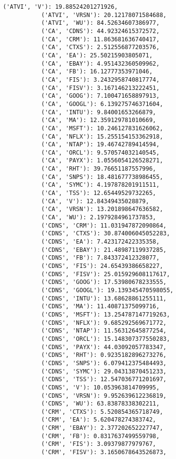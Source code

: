 \documentclass[11pt]{article}
\begin{document}
\begin{Verbatim}[commandchars=\\\{\}]
           ('ATVI', 'V'): 19.88524201271926,
           ('ATVI', 'VRSN'): 20.12178071584688,
           ('ATVI', 'WU'): 84.52634607386977,
           ('CA', 'CDNS'): 44.92324615372572,
           ('CA', 'CRM'): 11.863681636740417,
           ('CA', 'CTXS'): 2.512556877203576,
           ('CA', 'EA'): 25.50215903805071,
           ('CA', 'EBAY'): 4.951432360509962,
           ('CA', 'FB'): 16.12777353971046,
           ('CA', 'FIS'): 3.2432958740817774,
           ('CA', 'FISV'): 3.167146213222451,
           ('CA', 'GOOG'): 7.100471658897913,
           ('CA', 'GOOGL'): 6.139275746371604,
           ('CA', 'INTU'): 9.84001653266879,
           ('CA', 'MA'): 12.359129781010669,
           ('CA', 'MSFT'): 10.246127831626062,
           ('CA', 'NFLX'): 15.255154153362918,
           ('CA', 'NTAP'): 19.46742789414594,
           ('CA', 'ORCL'): 9.570574032140545,
           ('CA', 'PAYX'): 1.0556054126528271,
           ('CA', 'RHT'): 39.76651187557996,
           ('CA', 'SNPS'): 18.481677738986455,
           ('CA', 'SYMC'): 4.197878201911511,
           ('CA', 'TSS'): 12.65449529732265,
           ('CA', 'V'): 12.84349435028879,
           ('CA', 'VRSN'): 13.201898647636582,
           ('CA', 'WU'): 2.1979284961737853,
           ('CDNS', 'CRM'): 11.031947872090864,
           ('CDNS', 'CTXS'): 30.874006045052283,
           ('CDNS', 'EA'): 7.423172422335358,
           ('CDNS', 'EBAY'): 21.48987119937285,
           ('CDNS', 'FB'): 7.843372412328077,
           ('CDNS', 'FIS'): 24.65439386658227,
           ('CDNS', 'FISV'): 25.015929608117617,
           ('CDNS', 'GOOG'): 17.53980678233555,
           ('CDNS', 'GOOGL'): 19.139345470598055,
           ('CDNS', 'INTU'): 13.68628861255111,
           ('CDNS', 'MA'): 11.40871375099716,
           ('CDNS', 'MSFT'): 13.254787147719263,
           ('CDNS', 'NFLX'): 9.685292569671772,
           ('CDNS', 'NTAP'): 11.56312645877254,
           ('CDNS', 'ORCL'): 15.148307377550283,
           ('CDNS', 'PAYX'): 44.03092057783347,
           ('CDNS', 'RHT'): 0.9235182896273276,
           ('CDNS', 'SNPS'): 6.079412375484493,
           ('CDNS', 'SYMC'): 29.04313870451233,
           ('CDNS', 'TSS'): 12.547036771201697,
           ('CDNS', 'V'): 10.053963814709995,
           ('CDNS', 'VRSN'): 9.952639612236819,
           ('CDNS', 'WU'): 63.83878338302211,
           ('CRM', 'CTXS'): 5.520854365718749,
           ('CRM', 'EA'): 5.620478274383742,
           ('CRM', 'EBAY'): 2.377202652227747,
           ('CRM', 'FB'): 0.8317637499559798,
           ('CRM', 'FIS'): 3.09379877979767,
           ('CRM', 'FISV'): 3.1650678643526873,

\end{Verbatim}
\end{document}
